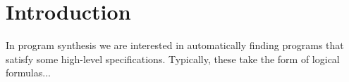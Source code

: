 
\chapter{Introduction}
\label{chapter:introduction}

In program synthesis we are interested in automatically finding programs that
satisfy some high-level specifications. Typically, these take the form of
logical formulas...








